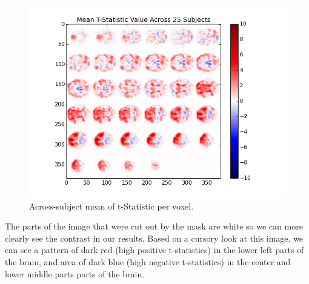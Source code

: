 \begin{figure}[ht] \centering
\includegraphics[scale=0.5]{../images/hypothesis_testing} \caption{Across-subject 
mean of t-Statistic per voxel.} \label{fig:ht} \end{figure}

\par The parts of the image that were cut out by the mask are white so we can 
more clearly see the contrast in our results. Based on a cursory look at this 
image, we can see a pattern of dark red (high positive t-statistics) in the lower 
left parts of the brain, and area of dark blue (high negative t-statistics) in 
the center and lower middle parts parts of the brain.


